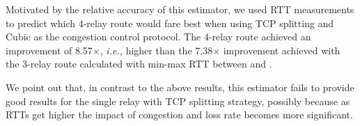 \documentclass[sigconf,usenames,dvipsnames,geometry]{acmart}
\newcommand{\mycomm}[3]{{\color{#2} \textbf{[#1: #3]}}}
\newcommand{\mycomm}[3]{}
\newcommand{\IK}[1]{\mycomm{IK}{blue}{#1}}
\newcommand{\AB}[1]{\mycomm{AB}{Orange}{#1}}
\providecommand{\ie}{\emph{i.e.,} }
\begin{document}
Motivated by the relative accuracy of this estimator, we used RTT measurements to predict which 4-relay route would fare best when using TCP splitting and Cubic as the congestion control protocol. The 4-relay route achieved an improvement of 8.57$\times$, \ie higher than the 7.38$\times$ improvement achieved with the 3-relay route calculated with min-max RTT between \rc and \rs. 
 
We point out that, in contrast to the above results, this estimator fails to provide good results for the single relay with TCP splitting strategy, possibly because as RTTs get higher the impact of congestion and loss rate becomes more significant.
\end{document}
